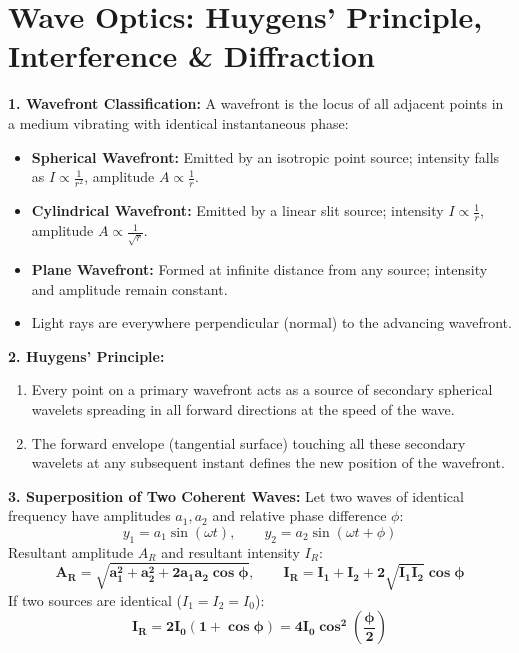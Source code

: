 \documentclass[10pt,twoside,openright]{book}
\begin{document}
\section{Wave Optics: Huygens' Principle, Interference \& Diffraction}

\begin{conceptbox}
\textbf{1. Wavefront Classification:}
A wavefront is the locus of all adjacent points in a medium vibrating with identical instantaneous phase:
\begin{itemize}
  \item \textbf{Spherical Wavefront:} Emitted by an isotropic point source; intensity falls as $I \propto \frac{1}{r^2}$, amplitude $A \propto \frac{1}{r}$.
  \item \textbf{Cylindrical Wavefront:} Emitted by a linear slit source; intensity $I \propto \frac{1}{r}$, amplitude $A \propto \frac{1}{\sqrt{r}}$.
  \item \textbf{Plane Wavefront:} Formed at infinite distance from any source; intensity and amplitude remain constant.
  \item Light rays are everywhere perpendicular (normal) to the advancing wavefront.
\end{itemize}
\textbf{2. Huygens' Principle:}
\begin{enumerate}
  \item Every point on a primary wavefront acts as a source of secondary spherical wavelets spreading in all forward directions at the speed of the wave.
  \item The forward envelope (tangential surface) touching all these secondary wavelets at any subsequent instant defines the new position of the wavefront.
\end{enumerate}
\textbf{3. Superposition of Two Coherent Waves:}
Let two waves of identical frequency have amplitudes $a_1, a_2$ and relative phase difference $\phi$:
\begin{equation}
  y_1 = a_1 \sin(\omega t), \qquad y_2 = a_2 \sin(\omega t + \phi)
\end{equation}
Resultant amplitude $A_R$ and resultant intensity $I_R$:
\begin{equation}
  \mathbf{A_R = \sqrt{a_1^2 + a_2^2 + 2a_1 a_2 \cos\phi}}, \qquad \mathbf{I_R = I_1 + I_2 + 2\sqrt{I_1 I_2}\cos\phi}
\end{equation}
If two sources are identical ($I_1 = I_2 = I_0$):
\begin{equation}
  \mathbf{I_R = 2I_0(1 + \cos\phi) = 4I_0 \cos^2\left(\frac{\phi}{2}\right)}

\end{equation}
\end{conceptbox}
\end{document}
